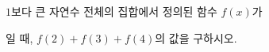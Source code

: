 $1$보다 큰 자연수 전체의 집합에서 정의된 함수 $f(x)$가\par\smallskip{}\par\smallskip\noindent 일 때, $f(2)+f(3)+f(4)$의 값을 구하시오.
